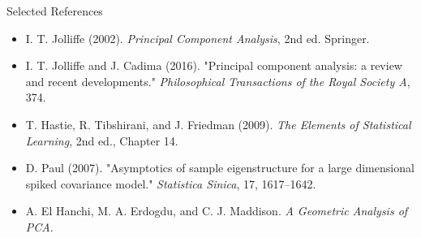 \documentclass{beamer}
\newcommand{\1}{\mathbbm{1}}
\begin{document}
\begin{frame}{Selected References}
  \small
  \begin{itemize}
    \item I. T. Jolliffe (2002). \textit{Principal Component Analysis}, 2nd ed. Springer.
    \item I. T. Jolliffe and J. Cadima (2016). "Principal component analysis: a review and recent developments." \textit{Philosophical Transactions of the Royal Society A}, 374.
    \item T. Hastie, R. Tibshirani, and J. Friedman (2009). \textit{The Elements of Statistical Learning}, 2nd ed., Chapter 14.
    \item D. Paul (2007). "Asymptotics of sample eigenstructure for a large dimensional spiked covariance model." \textit{Statistica Sinica}, 17, 1617--1642.
    \item A. El Hanchi, M. A. Erdogdu, and C. J. Maddison. \textit{A Geometric Analysis of PCA}.
  \end{itemize}
\end{frame}

\contactslide
\end{document}
